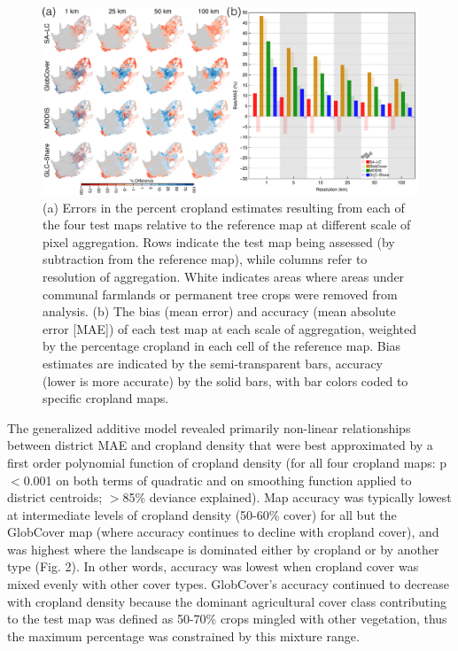 \documentclass[12 pt, titlepage, a4paper]{article}
\begin{document}
\begin{figure}[!ht]
\centerline{\includegraphics[width=1\textwidth]{figures/fig1.pdf}}
\vspace{-0.15 cm}
\caption{(a) Errors in the percent cropland estimates resulting from each of the four test maps relative to the reference map at different scale of pixel aggregation. Rows indicate the test map being assessed (by subtraction from the reference map), while columns refer to resolution of aggregation. White indicates areas where areas under communal farmlands or permanent tree crops were removed from analysis. (b) The bias (mean error) and accuracy (mean absolute error [MAE]) of each test map at each scale of aggregation, weighted by the percentage cropland in each cell of the reference map. Bias estimates are indicated by the semi-transparent bars, accuracy (lower is more accurate) by the solid bars, with bar colors coded to specific cropland maps.}
\label{afoto1}
\end{figure}

The generalized additive model revealed primarily non-linear relationships between district MAE and cropland density that were best approximated by a first order polynomial function of cropland density (for all four cropland maps: p$<$0.001 on both terms of quadratic and on smoothing function applied to district centroids; $>$85\% deviance explained). Map accuracy was typically lowest at intermediate levels of cropland density (50-60\% cover) for all but the GlobCover map (where accuracy continues to decline with cropland cover), and was highest where the landscape is dominated either by cropland or by another type (Fig. 2). In other words, accuracy was lowest when cropland cover was mixed evenly with other cover types. GlobCover's accuracy continued to decrease with cropland density because the dominant agricultural cover class contributing to the test map was defined as 50-70\% crops mingled with other vegetation, thus the maximum percentage was constrained by this mixture range.  
\end{document}
